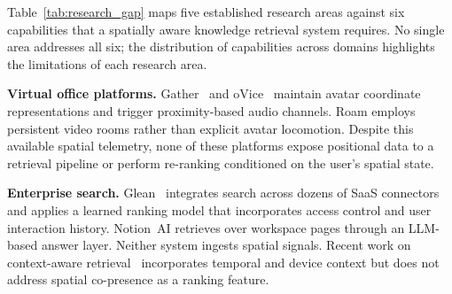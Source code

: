 \documentclass[journal]{IEEEtran}
\begin{document}
Table~\ref{tab:research_gap} maps five established research areas
against six capabilities that a spatially aware knowledge retrieval
system requires.  No single area addresses all six; the
distribution of capabilities across domains highlights the limitations
of each research area.

\begin{table}[t]
\centering
\caption{Research-gap analysis.  \checkmark\ = addressed,
         $\triangle$ = partially addressed, --- = not addressed.}
\label{tab:research_gap}
\end{table}

\textbf{Virtual office platforms.}
Gather~\cite{gather} and oVice~\cite{ovice}
maintain avatar coordinate representations and trigger proximity-based
audio channels.  Roam employs persistent video rooms rather than
explicit avatar locomotion.  Despite this available spatial telemetry, none of these platforms
expose positional data to a retrieval pipeline or perform re-ranking
conditioned on the user's spatial state.

\textbf{Enterprise search.}
Glean~\cite{glean} integrates search across dozens of SaaS
connectors and applies a learned ranking model that incorporates access
control and user interaction history.  Notion~AI retrieves over
workspace pages through an LLM-based answer layer.  Neither system
ingests spatial signals.  Recent work on context-aware
retrieval~\cite{car_survey} incorporates temporal and
device context but does not address spatial co-presence as a ranking
feature.
\end{document}
